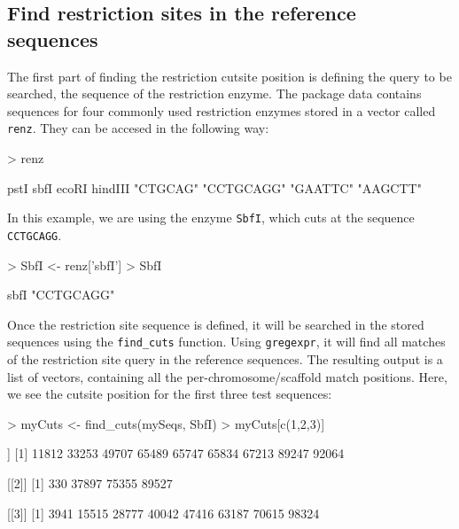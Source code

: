\documentclass{article}
\begin{document}
\subsection{Find restriction sites in the reference sequences}
The first part of finding the restriction cutsite position is defining the query to be searched, the sequence of the restriction enzyme. The package data contains sequences for four commonly used restriction enzymes stored in a vector called \texttt{renz}. They can be accesed in the following way:
\begin{Schunk}
\begin{Sinput}
> renz
\end{Sinput}
\begin{Soutput}
      pstI       sbfI      ecoRI    hindIII 
  "CTGCAG" "CCTGCAGG"   "GAATTC"   "AAGCTT" 
\end{Soutput}
\end{Schunk}

In this example, we are using the enzyme \texttt{SbfI}, which cuts at the sequence \texttt{CCTGCAGG}.
\begin{Schunk}
\begin{Sinput}
> SbfI <- renz['sbfI']
> SbfI
\end{Sinput}
\begin{Soutput}
      sbfI 
"CCTGCAGG" 
\end{Soutput}
\end{Schunk}
Once the restriction site sequence is defined, it will be searched in the stored sequences using the \texttt{find\_cuts} function. Using \texttt{gregexpr}, it will find all matches of the restriction site query in the reference sequences. The resulting output is a list of vectors, containing all the per-chromosome/scaffold match positions.
\bigbreak
Here, we see the cutsite position for the first three test sequences:

\begin{Schunk}
\begin{Sinput}
> myCuts <- find_cuts(mySeqs, SbfI)
> myCuts[c(1,2,3)]
\end{Sinput}
\begin{Soutput}
[[1]]
[1] 11812 33253 49707 65489 65747 65834 67213 89247 92064

[[2]]
[1]   330 37897 75355 89527

[[3]]
[1]  3941 15515 28777 40042 47416 63187 70615 98324
\end{Soutput}
\end{Schunk}
\end{document}
